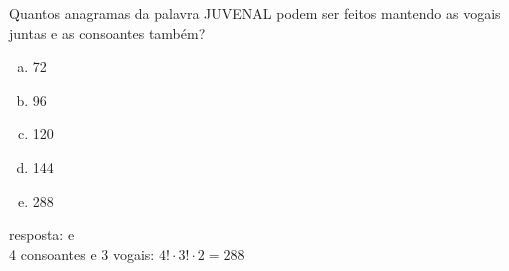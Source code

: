 \begin{ex}
 Quantos anagramas da palavra JUVENAL podem ser feitos mantendo as vogais juntas e as consoantes também?
    \begin{enumerate}[(a)]
    \item 72
    \item 96
    \item 120
    \item 144
    \item 288  
    \end{enumerate}
      \begin{sol}
     resposta: e  \\
     4 consoantes e 3 vogais: $4!\cdot3!\cdot2=288$
      \end{sol}
\end{ex}